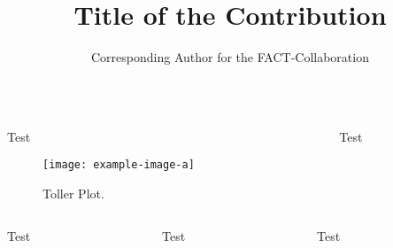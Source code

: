 

\title{Title of the Contribution}
\author{Corresponding Author for the FACT-Collaboration}

%
\begin{columns}[onlytextwidth]%
  \begin{column}{\textwidth}%
    \begin{block}
      \blindtext[2]
    \end{block}
  \end{column}%
\end{columns}%

\begin{columns}[onlytextwidth]%
  \begin{column}{0.5\textwidth}%
    \begin{block}[equal height group=A]{Test}%
      \begin{multicols}{2}
        \begin{figure}
          \texttt{[image: example-image-a]}\\
          \caption{Toller Plot.\cite{fact-performance}}\label{fig:tollerplot}
        \end{figure}
        \columnbreak
        \blindtext
      \end{multicols}
    \end{block}%
  \end{column}%
  \begin{column}{0.5\textwidth}%
    \begin{alertblock}[equal height group=A]{Test}%
      \begin{multicols}{2}
        \blindtext\cite{fact-reference}
        \blindtext
      \end{multicols}
    \end{alertblock}%
  \end{column}%
\end{columns}%

\begin{columns}[c, onlytextwidth]%
  \begin{column}{\thirdtextwidth}%
    \begin{exampleblock}{Test}%
      \blindtext%
    \end{exampleblock}%
  \end{column}%
  \begin{column}{\thirdtextwidth}%
    \begin{block}{Test}%
      \blindtext%
    \end{block}%
  \end{column}%
  \begin{column}{\thirdtextwidth}%
    \begin{block}{Test}%
      \blindtext%
    \end{block}%
  \end{column}%
\end{columns}%


